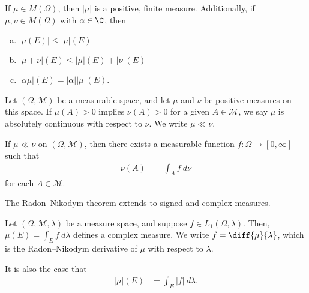 \begin{fact}
  If $\mu\in M\left(\Omega\right)$, then $\left\vert \mu \right\vert$ is a positive, finite measure. Additionally, if $\mu,\nu\in M\left(\Omega\right)$ with $\alpha\in \C$, then
  \begin{enumerate}[(a)]
    \item $\left\vert \mu\left(E\right) \right\vert\leq \left\vert \mu \right\vert\left(E\right)$
    \item $\left\vert \mu + \nu \right\vert\left(E\right) \leq \left\vert \mu \right\vert\left(E\right) + \left\vert \nu \right\vert\left(E\right)$
    \item $\left\vert \alpha\mu \right\vert\left(E\right) = \left\vert \alpha \right\vert\left\vert \mu \right\vert\left(E\right)$.
  \end{enumerate}
\end{fact}
\begin{definition}
  Let $\left(\Omega,\mathcal{M}\right)$ be a measurable space, and let $\mu$ and $\nu$ be positive measures on this space. If $\mu(A) > 0$ implies $\nu(A) > 0$ for a given $A\in \mathcal{M}$, we say $\mu$ is absolutely continuous with respect to $\nu$. We write $\mu \ll \nu$.
\end{definition}
\begin{theorem}
  If $\mu \ll \nu$ on $\left(\Omega,\mathcal{M}\right)$, then there exists a measurable function $f\colon \Omega\rightarrow [0,\infty]$ such that
  \begin{align*}
    \nu(A) &= \int_{A}^{} f \:d\nu
  \end{align*}
  for each $A\in \mathcal{M}$.
\end{theorem}
\begin{remark}
The Radon--Nikodym theorem extends to signed and complex measures.
\end{remark}
\begin{fact}
  Let $\left(\Omega,\mathcal{M},\lambda\right)$ be a measure space, and suppose $f\in L_{1}\left(\Omega,\lambda\right)$. Then, $\mu\left(E\right) = \int_{E}^{} f\:d\lambda$ defines a complex measure. We write $f = \diff{\mu}{\lambda}$, which is the Radon--Nikodym derivative of $\mu$ with respect to $\lambda$.\newline

  It is also the case that
  \begin{align*}
    \left\vert \mu \right\vert\left(E\right) &= \int_{E}^{} \left\vert f \right\vert\:d\lambda.
  \end{align*}
\end{fact}

